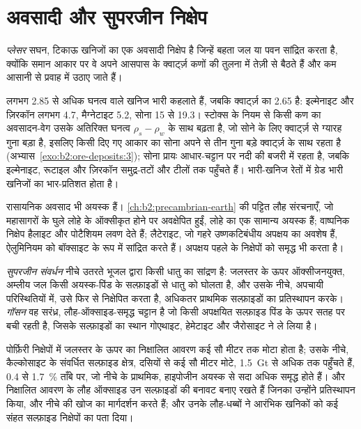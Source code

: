 \section{अवसादी और सुपरजीन निक्षेप}\label{sec:b2:ore-deposits:sedimentary}

\begin{definition}[प्लेसर]\label{def:b2:ore-deposits:placer}
\emph{प्लेसर} सघन, टिकाऊ खनिजों का एक अवसादी निक्षेप है जिन्हें बहता जल या पवन
सांद्रित करता है, क्योंकि समान आकार पर वे अपने आसपास के क्वार्ट्ज़ कणों की तुलना में तेज़ी से बैठते हैं और
कम आसानी से प्रवाह में उठाए जाते हैं।
\end{definition}

लगभग 2.85 से अधिक घनत्व वाले खनिज भारी कहलाते हैं, जबकि क्वार्ट्ज़ का 2.65 है: इल्मेनाइट और ज़िरकॉन
लगभग 4.7, मैग्नेटाइट 5.2, सोना 15 से 19.3। स्टोक्स के नियम से किसी कण का अवसादन-वेग उसके अतिरिक्त
घनत्व $\rho_s - \rho_w$ के साथ बढ़ता है, जो सोने के लिए क्वार्ट्ज़ से ग्यारह गुना बड़ा है, इसलिए किसी दिए
गए आकार का सोना अपने से तीन गुना बड़े क्वार्ट्ज़ के साथ रहता है (अभ्यास~\ref{exo:b2:ore-deposits:3}); सोना
प्रायः आधार-चट्टान पर नदी की बजरी में रहता है, जबकि इल्मेनाइट, रूटाइल और ज़िरकॉन समुद्र-तटों और टीलों तक
पहुँचते हैं। भारी-खनिज रेतों में ग्रेड भारी खनिजों का भार-प्रतिशत होता है।

रासायनिक अवसाद भी अयस्क हैं। \cref{ch:b2:precambrian-earth} की पट्टित लौह संरचनाएँ, जो महासागरों के
घुले लोहे के ऑक्सीकृत होने पर अवक्षेपित हुईं, लोहे का एक सामान्य अयस्क हैं; वाष्पनिक निक्षेप हैलाइट और
पोटैशियम लवण देते हैं; लैटेराइट, जो गहरे उष्णकटिबंधीय अपक्षय का अवशेष हैं, ऐलुमिनियम को बॉक्साइट के रूप
में सांद्रित करते हैं। अपक्षय पहले के निक्षेपों को समृद्ध भी करता है।

\begin{definition}[सुपरजीन संवर्धन, गॉसन]\label{def:b2:ore-deposits:supergene}
\emph{सुपरजीन संवर्धन} नीचे उतरते भूजल द्वारा किसी धातु का सांद्रण है: जलस्तर के
ऊपर ऑक्सीजनयुक्त, अम्लीय जल किसी अयस्क-पिंड के सल्फ़ाइडों से धातु को घोलता है, और उसके नीचे, अपचायी
परिस्थितियों में, उसे फिर से निक्षेपित करता है, अधिकतर प्राथमिक सल्फ़ाइडों का प्रतिस्थापन करके।
\emph{गॉसन} वह सरंध्र, लौह-ऑक्साइड-समृद्ध चट्टान है जो किसी अपक्षयित सल्फ़ाइड पिंड के ऊपर
सतह पर बची रहती है, जिसके सल्फ़ाइडों का स्थान गोएथाइट, हेमेटाइट और
जैरोसाइट ने ले लिया है।
\end{definition}

पोर्फ़िरी निक्षेपों में जलस्तर के ऊपर का निक्षालित आवरण कई सौ मीटर तक मोटा होता है; उसके नीचे, कैल्कोसाइट
के संवर्धित सल्फ़ाइड क्षेत्र, दसियों से कई सौ मीटर मोटे, \qty{1.5}{Gt} से अधिक तक पहुँचते हैं, 0.4 से
\qty{1.7}{\percent} ताँबे पर, जो नीचे के प्राथमिक, हाइपोजीन अयस्क से सदा अधिक समृद्ध होते हैं।  और
निक्षालित आवरण के लौह ऑक्साइड उन सल्फ़ाइडों की बनावट बनाए रखते हैं जिनका उन्होंने प्रतिस्थापन किया, और
नीचे की खोज का मार्गदर्शन करते हैं;  और उनके लौह-धब्बों ने आरंभिक खनिकों को कई संहत सल्फ़ाइड
निक्षेपों का पता दिया।

